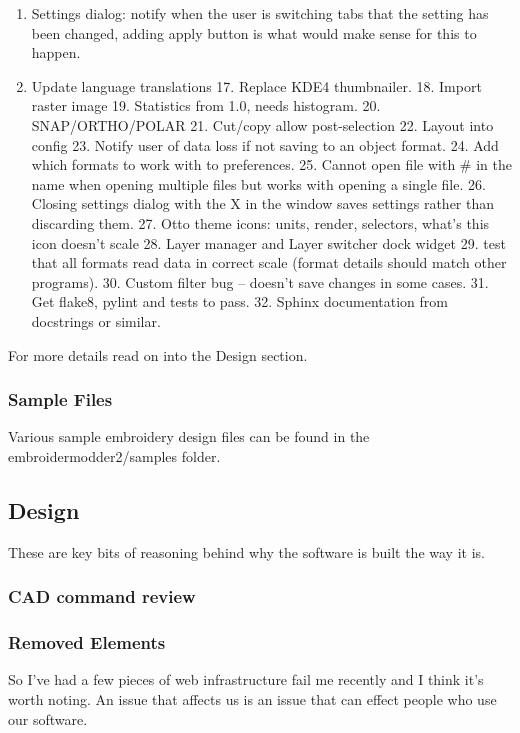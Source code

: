 \documentclass[a4paper, 11pt]{report}
\begin{document}
\begin{enumerate}
\item Settings dialog: notify when the user is switching tabs that the setting has been changed, adding apply button is what would make sense for this to happen.
\item Update language translations
17. Replace KDE4 thumbnailer.
18. Import raster image
19. Statistics from 1.0, needs histogram.
20. SNAP/ORTHO/POLAR
21. Cut/copy allow post-selection
22. Layout into config
23. Notify user of data loss if not saving to an object format.
24. Add which formats to work with to preferences.
25. Cannot open file with \# in the name when opening multiple files but works with opening a single file.
26. Closing settings dialog with the X in the window saves settings rather than discarding them.
27. Otto theme icons: units, render, selectors, what's this icon doesn't scale
28. Layer manager and Layer switcher dock widget
29. test that all formats read data in correct scale (format details should match other programs).
30. Custom filter bug -- doesn't save changes in some cases.
31. Get flake8, pylint and tests to pass.
32. Sphinx documentation from docstrings or similar.
\end{enumerate}

For more details read on into the Design section.

\subsubsection{Sample Files}

Various sample embroidery design files can be found in the embroidermodder2/samples folder.

\subsection{Design}

These are key bits of reasoning behind why the software is built the way it is.

\subsubsection{CAD command review}



\subsubsection{Removed Elements}

So I've had a few pieces of web infrastructure fail me recently and
I think it's worth noting. An issue that affects us is an issue that
can effect people who use our software.
\end{document}
